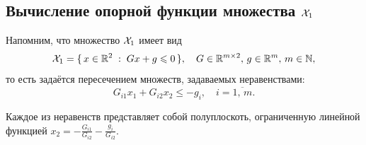 \subsection{Вычисление опорной функции множества $\mathcal{X}_1$}

Напомним, что множество $\mathcal{X}_1$ имеет вид
$$
        \mathcal{X}_1 = \{\, x \in \mathbb{R}^2\;:\; Gx + g \leqslant 0\,\},\quad G \in \mathbb{R}^{m\times 2},\,g\in \mathbb{R}^{m},\,m\in\mathbb{N},
$$
то есть задаётся пересечением множеств, задаваемых неравенствами:
$$
        G_{i1}x_1 + G_{i2}x_2 \leqslant -g_i,\quad i = \overline{1,\,m}.
$$

Каждое из неравенств представляет собой полуплоскоть, ограниченную линейной функцией $x_2 = -\frac{G_{i1}}{G_{i2}} - \frac{g_i}{G_{i2}}$.
